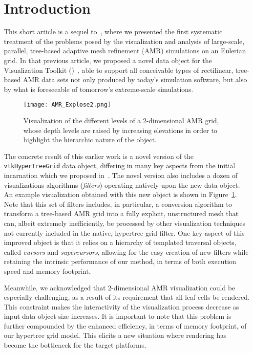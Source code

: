 \section{Introduction}
\label{s:introduction}
This short article is a sequel to~\cite{harel:17}, where we 
presented the first systematic treatment of the problems posed by the
visualization and analysis of large-scale, parallel, tree-based
adaptive mesh refinement (AMR) simulations on an Eulerian grid.
In that previous article, we proposed a novel data object for the
Visualization Toolkit (\VTK)~\cite{avila:10}, able to
support all conceivable types of rectilinear, tree-based AMR data sets
not only produced by today's simulation software, but also by what is
foreseeable of tomorrow's extreme-scale simulations.

\begin{figure}[h!]
\centering
\texttt{[image: AMR\_Explose2.png]}
\caption{Visualization of the different levels of a $2$-dimensional
AMR grid, whose depth levels are raised by increasing elevations in
order to highlight the hierarchic nature of the object.}
\label{fig:AMR_Explose2}
\end{figure}
The concrete result of this earlier work is a novel version
of the \texttt{vtkHyperTreeGrid} data object, differing in many key
aspects from the initial incarnation which we proposed
in~\cite{carrard:imr21}.
The novel version also includes a dozen of visualizations algorithms
(\emph{filters}) operating natively upon the new data object.
An example visualization obtained with this new object is shown in
Figure~\ref{fig:AMR_Explose2}.
Note that this set of filters includes, in particular, a conversion
algorithm to transform a tree-based AMR grid into a fully explicit,
unstructured mesh that can, albeit extremely 
inefficiently, be processed by other visualization techniques not
currently included in the native, hypertree grid filter.
One key aspect of this improved object is that it relies on a
hierarchy of templated traversal objects, called \emph{cursors} and
\emph{supercursors}, allowing for the easy creation of new filters
while retaining the intrinsic performance of our method, in terms
of both execution speed and memory footprint.

Meanwhile, we acknowledged that $2$-dimensional AMR visualization
could be especially challenging, as a result of its requirement that
all leaf cells be rendered.
This constraint makes the interactivity of the visualization process
decrease as input data object size increases.
It is important to note that this problem is further compounded by the
enhanced efficiency, in terms of memory footprint, of our hypertree
grid model.
This elicits a new situation where rendering has become
the bottleneck for the target platforms.

